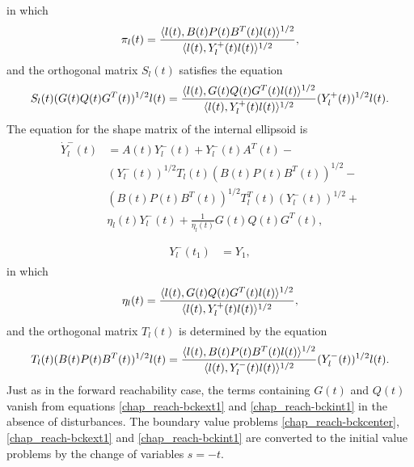 \documentclass[letterpaper,10pt,english]{sphinxmanual}
\begin{document}
in which
\begin{gather}
\begin{split}\pi_l(t) = \frac{\langle l(t),
B(t)P(t)B^T(t)l(t)\rangle^{1/2}}{\langle l(t),
Y^+_l(t)l(t)\rangle^{1/2}},\end{split}\notag
\end{gather}
and the orthogonal matrix $S_l(t)$ satisfies the equation
\begin{gather}
\begin{split}S_l(t)(G(t)Q(t)G^T(t))^{1/2}l(t) = \frac{\langle l(t),
G(t)Q(t)G^T(t)l(t)\rangle^{1/2}}{\langle l(t),
Y_l^+(t)l(t)\rangle^{1/2}}(Y_l^{+}(t))^{1/2}l(t).\end{split}\notag
\end{gather}
The equation for the shape matrix of the internal ellipsoid is
\label{chap_reach:equation-bckint1}\begin{gather}
\begin{split}\dot{Y}^-_l(t) & =  A(t)Y^-_l(t) + Y^-_l(t)A^T(t) -\nonumber \\
& (Y_l^{-}(t))^{1/2}T_l(t)(B(t)P(t)B^T(t))^{1/2} -\nonumber \\
& (B(t)P(t)B^T(t))^{1/2}T_l^T(t)(Y_l^{-}(t))^{1/2} +\nonumber \\
& \eta_l(t)Y^-_l(t) + \frac{1}{\eta_l(t)}G(t)Q(t)G^T(t),\\\end{split}\label{chap_reach-bckint1}
\end{gather}\label{chap_reach:equation-bckint2}\begin{gather}
\begin{split}Y^-_l(t_1) & = Y_1,\end{split}\label{chap_reach-bckint2}
\end{gather}
in which
\begin{gather}
\begin{split}\eta_l(t) = \frac{\langle l(t),
G(t)Q(t)G^T(t)l(t)\rangle^{1/2}}{\langle l(t),
Y^+_l(t)l(t)\rangle^{1/2}},\end{split}\notag
\end{gather}
and the orthogonal matrix $T_l(t)$ is determined by the equation
\begin{gather}
\begin{split}T_l(t)(B(t)P(t)B^T(t))^{1/2}l(t) = \frac{\langle l(t),
B(t)P(t)B^T(t)l(t)\rangle^{1/2}}{\langle l(t),
Y_l^-(t)l(t)\rangle^{1/2}}(Y_l^{-}(t))^{1/2}l(t).\end{split}\notag
\end{gather}
Just as in the forward reachability case, the terms containing
$G(t)$ and $Q(t)$ vanish from equations \eqref{chap_reach-bckext1} and
\eqref{chap_reach-bckint1} in the absence of disturbances. The boundary value problems
\eqref{chap_reach-bckcenter}, \eqref{chap_reach-bckext1} and \eqref{chap_reach-bckint1} are converted to the initial
value problems by the change of variables $s = -t$.
\end{document}
